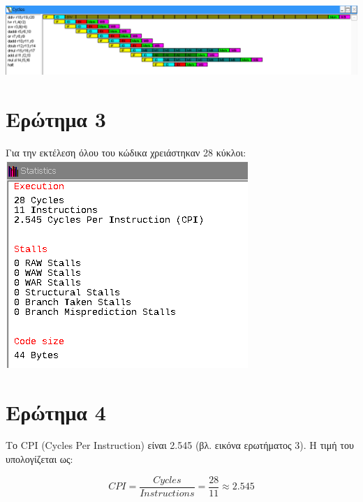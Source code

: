 \documentclass[12pt]{article}
\begin{document}
\includegraphics[width=\textwidth]{res/cycles.png}

\section{Ερώτημα 3}

Για την εκτέλεση όλου του κώδικα χρειάστηκαν 28 κύκλοι: \\

\includegraphics{res/total.png}

\section{Ερώτημα 4}

Το CPI (Cycles Per Instruction) είναι 2.545 (βλ. εικόνα ερωτήματος 3). Η τιμή του υπολογίζεται ως:

\[
	CPI = \frac{Cycles}{Instructions} = \frac{28}{11} \approx 2.545
\]
\end{document}
